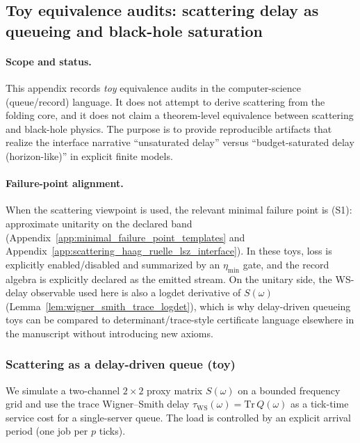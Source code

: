 \subsection{Toy equivalence audits: scattering delay as queueing and black-hole saturation}
\label{app:scattering_bh_toy_equivalence_audits}

\paragraph{Scope and status.}
\AuditTag This appendix records \emph{toy} equivalence audits in the computer-science (queue/record) language.
It does not attempt to derive scattering from the folding core, and it does not claim a theorem-level equivalence
between scattering and black-hole physics.
The purpose is to provide reproducible artifacts that realize the interface narrative
``unsaturated delay'' versus ``budget-saturated delay (horizon-like)'' in explicit finite models.

\paragraph{Failure-point alignment.}
\AuditTag When the scattering viewpoint is used, the relevant minimal failure point is (S1): approximate unitarity on the declared band
(Appendix~\ref{app:minimal_failure_point_templates} and Appendix~\ref{app:scattering_haag_ruelle_lsz_interface}).
In these toys, loss is explicitly enabled/disabled and summarized by an $\eta_{\min}$ gate, and the record algebra is explicitly declared
as the emitted stream.
\AuditTag On the unitary side, the WS-delay observable used here is also a logdet derivative of $S(\omega)$ (Lemma~\ref{lem:wigner_smith_trace_logdet}),
which is why delay-driven queueing toys can be compared to determinant/trace-style certificate language elsewhere in the manuscript without introducing new axioms.

\subsubsection{Scattering as a delay-driven queue (toy)}
\label{subsec:scattering_delay_queue_toy}

\AuditTag We simulate a two-channel $2\times2$ proxy matrix $S(\omega)$ on a bounded frequency grid and use the trace Wigner--Smith delay
$\tau_{\mathrm{WS}}(\omega)=\mathrm{Tr}\,Q(\omega)$ as a tick-time service cost for a single-server queue.
The load is controlled by an explicit arrival period (one job per $p$ ticks).


